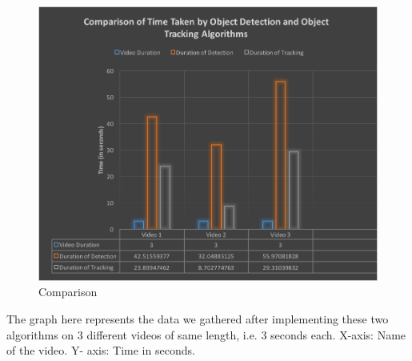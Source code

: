 \documentclass[10pt,twocolumn,letterpaper]{article}
\begin{document}
\begin{figure}
\includegraphics[width=\linewidth]{Picture1.png}
\caption{Comparison}
\end{figure}
  
  The graph here represents the data we gathered after implementing these two algorithms on 3 different videos of same length, i.e. 3 seconds each.  
X-axis: Name of the video.
Y- axis: Time in seconds.
\end{document}
